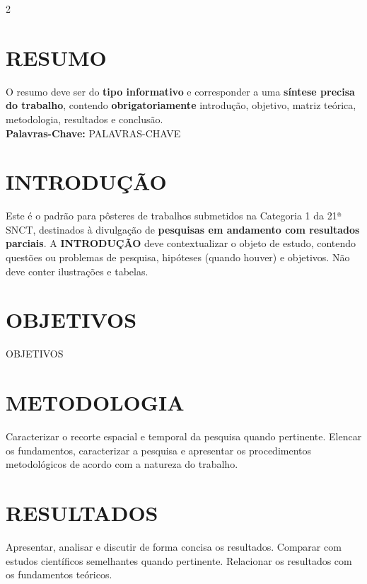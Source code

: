 \documentclass[a0,portrait]{a0poster}
\begin{document}
\begin{multicols}{2} %
\justify %
\section*{RESUMO}
\vspace{-1cm}
O resumo deve ser do \textbf{tipo informativo} e corresponder a uma \textbf{síntese precisa do trabalho}, contendo \textbf{obrigatoriamente} introdução, objetivo, matriz teórica, metodologia, resultados e conclusão.\\

\hspace{-0,5cm}\textbf{Palavras-Chave:} PALAVRAS-CHAVE
\section*{INTRODUÇÃO}
\vspace{-1cm}
Este é o padrão para pôsteres de trabalhos submetidos na Categoria 1 da 21ª SNCT, destinados à divulgação de \textbf{pesquisas em andamento com resultados parciais}.
A \textbf{INTRODUÇÃO} deve contextualizar o objeto de estudo, contendo questões ou problemas de pesquisa, hipóteses (quando houver) e objetivos. Não deve conter ilustrações e tabelas. 

\section*{OBJETIVOS}
\vspace{-1cm}
OBJETIVOS


\section*{METODOLOGIA}
\vspace{-1cm}
Caracterizar o recorte espacial e temporal da pesquisa quando pertinente. Elencar os fundamentos, caracterizar a pesquisa e apresentar os procedimentos metodológicos de acordo com a natureza do trabalho.

\section*{RESULTADOS}
\vspace{-1cm}
Apresentar, analisar e discutir de forma concisa os resultados. Comparar com estudos científicos semelhantes quando pertinente. Relacionar os resultados com os fundamentos teóricos.


\end{multicols}
\end{document}

